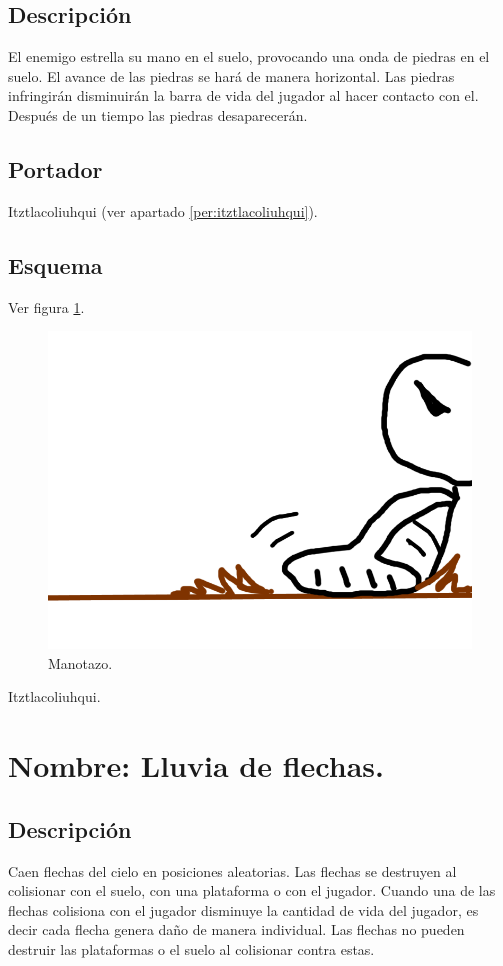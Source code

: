\subsection{Descripción}
El enemigo estrella su mano en el suelo, provocando una onda de piedras en el suelo. El avance de las piedras se hará de manera horizontal. Las piedras infringirán disminuirán la barra de vida del jugador al hacer contacto con el. Después de un tiempo las piedras desaparecerán.
\subsection{Portador}
Itztlacoliuhqui (ver apartado \ref{per:itztlacoliuhqui}).
\subsection{Esquema}
			Ver figura \ref{fig:manotazo}.
			\begin{figure}
				\centering
				\includegraphics[height=0.2 \textheight]{Imagenes/manotazo}
				\caption{Manotazo.}
				\label{fig:manotazo}
			\end{figure}
Itztlacoliuhqui.

\section{Nombre: Lluvia de flechas.} \label{hab.LluviaFle}
\subsection{Descripción}
Caen flechas del cielo en posiciones aleatorias. Las flechas se destruyen al colisionar con el suelo, con una plataforma o con el jugador. Cuando una de las flechas colisiona con el jugador disminuye la cantidad de vida del jugador, es decir cada flecha genera daño de manera individual. Las flechas no pueden destruir las plataformas o el suelo al colisionar contra estas.
